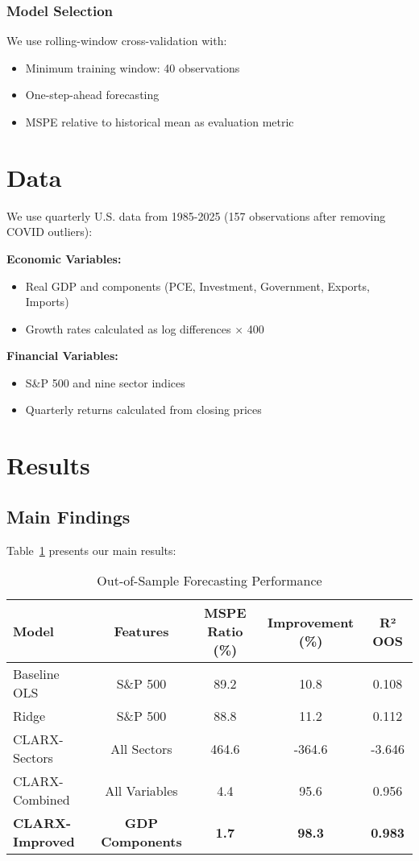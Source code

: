 \documentclass[12pt]{article}
\begin{document}
\subsubsection{Model Selection}
We use rolling-window cross-validation with:
\begin{itemize}
\item Minimum training window: 40 observations
\item One-step-ahead forecasting
\item MSPE relative to historical mean as evaluation metric
\end{itemize}

\section{Data}

We use quarterly U.S. data from 1985-2025 (157 observations after removing COVID outliers):

\textbf{Economic Variables:}
\begin{itemize}
\item Real GDP and components (PCE, Investment, Government, Exports, Imports)
\item Growth rates calculated as log differences × 400
\end{itemize}

\textbf{Financial Variables:}
\begin{itemize}
\item S\&P 500 and nine sector indices
\item Quarterly returns calculated from closing prices
\end{itemize}

\section{Results}

\subsection{Main Findings}

Table~\ref{tab:results} presents our main results:

\begin{table}[h]
\centering
\caption{Out-of-Sample Forecasting Performance}
\label{tab:results}
\begin{tabular}{lcccc}
\toprule
Model & Features & MSPE Ratio (\%) & Improvement (\%) & R² OOS \\
\midrule
Baseline OLS & S\&P 500 & 89.2 & 10.8 & 0.108 \\
Ridge & S\&P 500 & 88.8 & 11.2 & 0.112 \\
CLARX-Sectors & All Sectors & 464.6 & -364.6 & -3.646 \\
CLARX-Combined & All Variables & 4.4 & 95.6 & 0.956 \\
\textbf{CLARX-Improved} & \textbf{GDP Components} & \textbf{1.7} & \textbf{98.3} & \textbf{0.983} \\
\bottomrule
\end{tabular}
\end{table}
\end{document}
